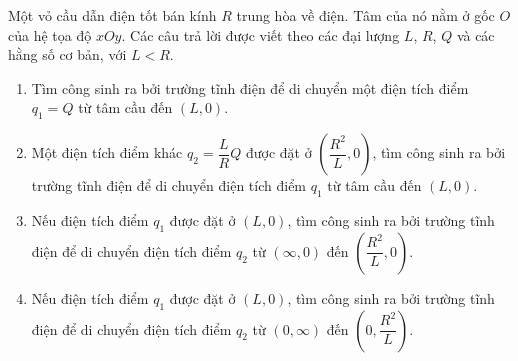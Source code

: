 \begin{vd}
Một vỏ cầu dẫn điện tốt bán kính $R$ trung hòa về điện. Tâm của nó nằm ở gốc $O$ của hệ tọa độ $xOy$. Các câu trả lời được viết theo các đại lượng $L$, $R$, $Q$ và các hằng số cơ bản, với $L<R$.
\begin{enumerate}[1)]
    \item Tìm công sinh ra bởi trường tĩnh điện để di chuyển một điện tích điểm $q_1=Q$ từ tâm cầu đến $(L,0)$.
    \item Một điện tích điểm khác $q_2=\dfrac{L}{R}Q$ được đặt ở $\left(\dfrac{R^2}{L},0\right)$, tìm công sinh ra bởi trường tĩnh điện để di chuyển điện tích điểm $q_1$ từ tâm cầu đến $(L,0)$.
    \item Nếu điện tích điểm $q_1$ được đặt ở $(L,0)$, tìm công sinh ra bởi trường tĩnh điện để di chuyển điện tích điểm $q_2$ từ $(\infty,0)$ đến $\left(\dfrac{R^2}{L},0\right)$.
    \item Nếu điện tích điểm $q_1$ được đặt ở $(L,0)$, tìm công sinh ra bởi trường tĩnh điện để di chuyển điện tích điểm $q_2$ từ $(0,\infty)$ đến $\left(0,\dfrac{R^2}{L}\right)$.
\end{enumerate}
\end{vd}
